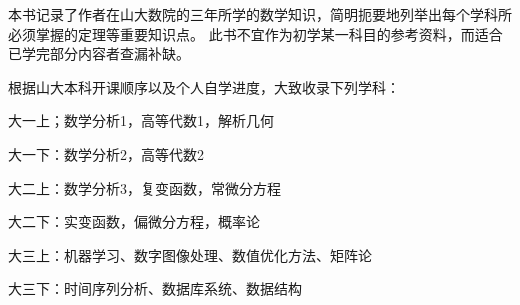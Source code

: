  \vspace*{0.0cm}
\thispagestyle{empty}
\vspace*{2.2cm}
\centerline{\hei{\color{darkblue}{内~容~简~介}}}\vspace{2cm}

本书记录了作者在山大数院的三年所学的数学知识，简明扼要地列举出每个学科所必须掌握的定理等重要知识点。
此书不宜作为初学某一科目的参考资料，而适合已学完部分内容者查漏补缺。

根据山大本科开课顺序以及个人自学进度，大致收录下列学科：

大一上；数学分析1，高等代数1，解析几何

大一下：数学分析2，高等代数2

大二上：数学分析3，复变函数，常微分方程

大二下：实变函数，偏微分方程，概率论

大三上：机器学习、数字图像处理、数值优化方法、矩阵论

大三下：时间序列分析、数据库系统、数据结构

